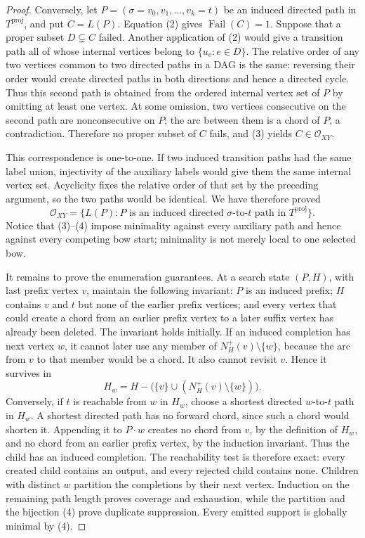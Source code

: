 \documentclass{article}
\begin{document}
\begin{proof}
Conversely, let \(P=(\sigma=v_0,v_1,\ldots,v_k=t)\) be an induced directed path in \(T^{\mathrm{proj}}\), and put \(C=L(P)\).  Equation (2) gives \(\operatorname{Fail}(C)=1\).  Suppose that a proper subset \(D\subsetneq C\) failed.  Another application of (2) would give a transition path all of whose internal vertices belong to \(\{u_e:e\in D\}\).  The relative order of any two vertices common to two directed paths in a DAG is the same: reversing their order would create directed paths in both directions and hence a directed cycle.  Thus this second path is obtained from the ordered internal vertex set of \(P\) by omitting at least one vertex.  At some omission, two vertices consecutive on the second path are nonconsecutive on \(P\); the arc between them is a chord of \(P\), a contradiction.  Therefore no proper subset of \(C\) fails, and (3) yields \(C\in\mathcal O_{XY}\).

This correspondence is one-to-one.  If two induced transition paths had the same label union, injectivity of the auxiliary labels would give them the same internal vertex set.  Acyclicity fixes the relative order of that set by the preceding argument, so the two paths would be identical.  We have therefore proved
\[
 \mathcal O_{XY}
 =\{L(P):P\text{ is an induced directed }\sigma\text{-to-}t
       \text{ path in }T^{\mathrm{proj}}\}.
\tag{4}
\]
Notice that (3)--(4) impose minimality against every auxiliary path and hence against every competing bow start; minimality is not merely local to one selected bow.

It remains to prove the enumeration guarantees.  At a search state \((P,H)\), with last prefix vertex \(v\), maintain the following invariant: \(P\) is an induced prefix; \(H\) contains \(v\) and \(t\) but none of the earlier prefix vertices; and every vertex that could create a chord from an earlier prefix vertex to a later suffix vertex has already been deleted.  The invariant holds initially.  If an induced completion has next vertex \(w\), it cannot later use any member of \(N_H^+(v)\setminus\{w\}\), because the arc from \(v\) to that member would be a chord.  It also cannot revisit \(v\).  Hence it survives in
\[
 H_w=H-\bigl(\{v\}\cup(N_H^+(v)\setminus\{w\})\bigr).
\]
Conversely, if \(t\) is reachable from \(w\) in \(H_w\), choose a shortest directed \(w\)-to-\(t\) path in \(H_w\).  A shortest directed path has no forward chord, since such a chord would shorten it.  Appending it to \(P\cdot w\) creates no chord from \(v\), by the definition of \(H_w\), and no chord from an earlier prefix vertex, by the induction invariant.  Thus the child has an induced completion.  The reachability test is therefore exact: every created child contains an output, and every rejected child contains none.  Children with distinct \(w\) partition the completions by their next vertex.  Induction on the remaining path length proves coverage and exhaustion, while the partition and the bijection (4) prove duplicate suppression.  Every emitted support is globally minimal by (4).


\end{proof}
\end{document}
